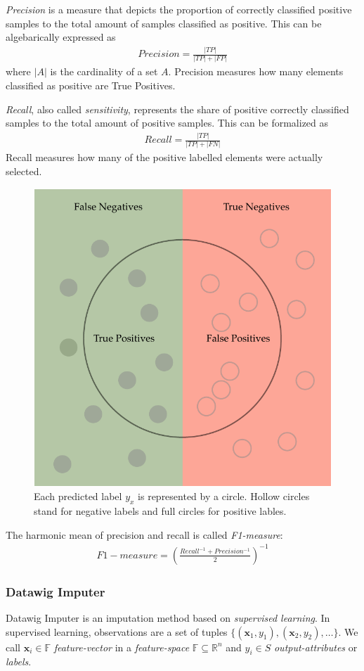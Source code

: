 \emph{Precision} is a measure that depicts the proportion of correctly classified positive samples to the total amount of samples classified as positive.\cite[p.4]{THA18} This can be algebarically expressed as
\begin{align}
    Precision = \frac{|TP|}{|TP| + |FP|}
\end{align}
where \(|A|\) is the cardinality of a set \(A\). Precision measures how many elements classified as positive are True Positives.

\emph{Recall}, also called \emph{sensitivity}, represents the
share of positive correctly classified samples to the total amount of positive samples.\cite[p.3]{THA18} This can be formalized as
\begin{align}
    Recall = \frac{|TP|}{|TP| + |FN|}
\end{align}
Recall measures how many of the positive labelled elements were actually selected.

\begin{figure}[ht]
    \centering
    \includegraphics[width=.5\textwidth]{images/precision-and-recall}
    \caption{Each predicted label \(y_{x}\) is represented by a circle. Hollow circles stand for negative labels and full circles for positive lables.  }
    \label{fig:precision-and-recall}
\end{figure}

The harmonic mean of precision and recall is called \emph{F1-measure}:
\begin{align}
F1-measure = {\left(\frac{Recall^{-1} + Precision^{-1}}{2}\right)}^{-1}
\end{align}

\subsubsection{Datawig Imputer}
Datawig Imputer is an imputation method based on \emph{supervised learning}.
In supervised learning, observations are a set of tuples \( \{\left(\mathbold{x}_1, y_1\right),\left(\mathbold{x}_2, y_2\right), \dots \} \).
We call \( \mathbold{x}_i \in \mathbb{F}\) \emph{feature-vector} in a \emph{feature-space} \( \mathbb{F} \subseteq \mathbb{R}^{n} \) and \( y_i \in S \) \emph{output-attributes} or \emph{labels}.\cite[p.19]{DUD00}

